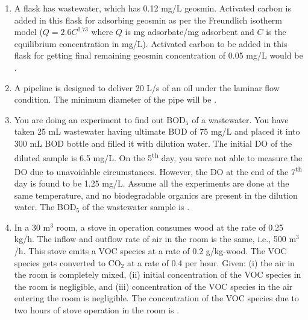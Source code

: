 \documentclass[journal,12pt,onecolumn]{IEEEtran}
\theoremstyle{remark}
\begin{document}
\begin{enumerate}
\item A flask  has wastewater, which has 0.12 mg/L geosmin. Activated carbon is added in this flask for adsorbing geosmin as per the Freundlich isotherm model ($Q = 2.6C^{0.73}$ where $Q$ is mg adsorbate/mg adsorbent and $C$ is the equilibrium concentration in mg/L). Activated carbon to be added in this flask for getting final remaining geosmin concentration of 0.05 mg/L would be \underline{\hspace{2cm}} .  
\hfill{}

\item A pipeline is designed to deliver 20 L/s of an oil  under the laminar flow condition. The minimum diameter of the pipe will be \underline{\hspace{2cm}} .  
\hfill{}

\item You are doing an experiment to find out BOD$_5$ of a wastewater. You have taken 25 mL wastewater having ultimate BOD of 75 mg/L and placed it into 300 mL BOD bottle and filled it with dilution water. The initial DO of the diluted sample is 6.5 mg/L. On the 5\textsuperscript{th} day, you were not able to measure the DO due to unavoidable circumstances. However, the DO at the end of the 7\textsuperscript{th} day is found to be 1.25 mg/L. Assume all the experiments are done at the same temperature, and no biodegradable organics are present in the dilution water. The BOD$_5$ of the wastewater sample is \underline{\hspace{2cm}} .  
\hfill{}
\item In a 30 m$^3$ room, a stove in operation consumes wood at the rate of 0.25 kg/h. The inflow and outflow rate of air in the room is the same, i.e., 500 m$^3$/h. This stove emits a VOC species at a rate of 0.2 g/kg-wood. The VOC species gets converted to CO$_2$ at a rate of 0.4 per hour. Given: (i) the air in the room is completely mixed, (ii) initial concentration of the VOC species in the room is negligible, and (iii) concentration of the VOC species in the air entering the room is negligible. The concentration of the VOC species due to two hours of stove operation in the room is \underline{\hspace{2cm}} .  
\hfill{}


\end{enumerate}
\end{document}
